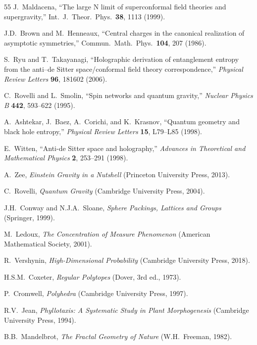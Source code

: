 \documentclass[aps,prd,preprint,superscriptaddress,showpacs,nofootinbib,longbibliography]{revtex4-2}
\begin{document}
\begin{thebibliography}{55}
J.~Maldacena,
``The large N limit of superconformal field theories and supergravity,''
Int.\ J.\ Theor.\ Phys.\ \textbf{38}, 1113 (1999).

J.D.~Brown and M.~Henneaux,
``Central charges in the canonical realization of asymptotic symmetries,''
Commun.\ Math.\ Phys.\ \textbf{104}, 207 (1986).

S.~Ryu and T.~Takayanagi,
``Holographic derivation of entanglement entropy from the anti--de Sitter space/conformal field theory correspondence,''
\textit{Physical Review Letters} \textbf{96}, 181602 (2006).

C.~Rovelli and L.~Smolin,
``Spin networks and quantum gravity,''
\textit{Nuclear Physics B} \textbf{442}, 593--622 (1995).

A.~Ashtekar, J.~Baez, A.~Corichi, and K.~Krasnov,
``Quantum geometry and black hole entropy,''
\textit{Physical Review Letters} \textbf{15}, L79--L85 (1998).

E.~Witten,
``Anti-de Sitter space and holography,''
\textit{Advances in Theoretical and Mathematical Physics} \textbf{2}, 253--291 (1998).

A.~Zee,
\textit{Einstein Gravity in a Nutshell} (Princeton University Press, 2013).

C.~Rovelli,
\textit{Quantum Gravity} (Cambridge University Press, 2004).

J.H.~Conway and N.J.A.~Sloane,
\textit{Sphere Packings, Lattices and Groups} (Springer, 1999).

M.~Ledoux,
\textit{The Concentration of Measure Phenomenon} (American Mathematical Society, 2001).

R.~Vershynin,
\textit{High-Dimensional Probability} (Cambridge University Press, 2018).

H.S.M.~Coxeter,
\textit{Regular Polytopes} (Dover, 3rd ed., 1973).

P.~Cromwell,
\textit{Polyhedra} (Cambridge University Press, 1997).

R.V.~Jean,
\textit{Phyllotaxis: A Systematic Study in Plant Morphogenesis} (Cambridge University Press, 1994).

B.B.~Mandelbrot,
\textit{The Fractal Geometry of Nature} (W.H.~Freeman, 1982).


\end{thebibliography}
\end{document}
